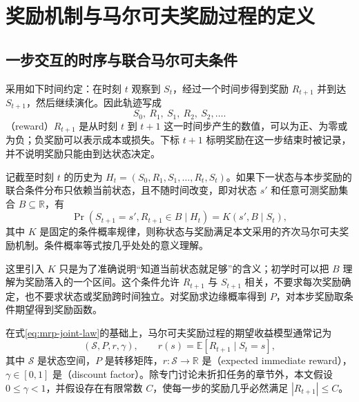 \documentclass[UTF8]{ctexart}
\begin{document}
\section{奖励机制与马尔可夫奖励过程的定义}
\label{sec:mrp-definition}

\subsection{一步交互的时序与联合马尔可夫条件}

采用如下时间约定：在时刻 $t$ 观察到 $S_t$，经过一个时间步得到奖励 $R_{t+1}$ 并到达 $S_{t+1}$，然后继续演化。因此轨迹写成
\[
  S_0,\ R_1,\ S_1,\ R_2,\ S_2,\ldots.
\]
（reward）$R_{t+1}$ 是从时刻 $t$ 到 $t+1$ 这一时间步产生的数值，可以为正、为零或为负；负奖励可以表示成本或损失。下标 $t+1$ 标明奖励在这一步结束时被记录，并不说明奖励只能由到达状态决定。

\begin{definition}[齐次马尔可夫奖励机制]
记截至时刻 $t$ 的历史为 $H_t=(S_0,R_1,S_1,\ldots,R_t,S_t)$。如果下一状态与本步奖励的联合条件分布只依赖当前状态，且不随时间改变，即对状态 $s'$ 和任意可测奖励集合 $B\subseteq\mathbb R$，有
\begin{equation}
  \Pr(S_{t+1}=s',R_{t+1}\in B\mid H_t)
  =K(s',B\mid S_t),
  \label{eq:mrp-joint-law}
\end{equation}
其中 $K$ 是固定的条件概率规律，则称状态与奖励满足本文采用的齐次马尔可夫奖励机制。条件概率等式按几乎处处的意义理解。
\end{definition}

这里引入 $K$ 只是为了准确说明“知道当前状态就足够”的含义；初学时可以把 $B$ 理解为奖励落入的一个区间。这个条件允许 $R_{t+1}$ 与 $S_{t+1}$ 相关，不要求每次奖励确定，也不要求状态或奖励跨时间独立。对奖励求边缘概率得到 $P$，对本步奖励取条件期望得到奖励函数。

\begin{definition}[期望收益模型的四元组]
在式\eqref{eq:mrp-joint-law}的基础上，马尔可夫奖励过程的期望收益模型通常记为
\begin{equation}
  (\mathcal S,P,r,\gamma),\qquad
  r(s)=\mathbb E[R_{t+1}\mid S_t=s],
  \label{eq:mrp-tuple}
\end{equation}
其中 $\mathcal S$ 是状态空间，$P$ 是转移矩阵，$r:\mathcal S\to\mathbb R$ 是（expected immediate reward），$\gamma\in[0,1]$ 是（discount factor）。除专门讨论未折扣任务的章节外，本文假设 $0\leq\gamma<1$，并假设存在有限常数 $C$，使每一步的奖励几乎必然满足 $|R_{t+1}|\leq C$。
\end{definition}
\end{document}
